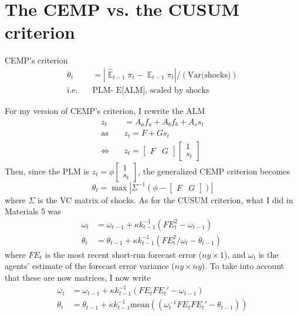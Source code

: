 \documentclass[11pt]{article}
\renewcommand{\[}{\begin{equation}}
\renewcommand{\]}{\end{equation}}
\DeclareMathOperator{\E}{\mathbb{E}}
\begin{document}
\clearpage


\newpage
\section{The CEMP vs. the CUSUM criterion}

CEMP's criterion  
\begin{align}
\theta_t & = |\hat{\E}_{t-1}\pi_t - \E_{t-1}\pi_t | / (\text{Var(shocks)}) \\
\text{i.e.} \quad &\text{PLM- E[ALM], scaled by shocks}
\end{align}

For my version of CEMP's criterion, I rewrite the ALM
\begin{align}
z_t & = A_a f_a + A_b f_b + A_s s_t \\
\text{as} \quad & z_t =  F  +Gs_t  \\
\Leftrightarrow \quad & z_t = \begin{bmatrix} F & G \end{bmatrix} \begin{bmatrix} 1 \\ s_t\end{bmatrix}
\end{align}
Then, since the PLM is $z_t = \phi  \begin{bmatrix} 1 \\ s_t\end{bmatrix}$, the generalized CEMP criterion becomes
\begin{equation}
\theta_t = \max | \Sigma^{-1} ( \phi - \begin{bmatrix} F & G \end{bmatrix}) |
\end{equation}
where $\Sigma$ is the VC matrix of shocks.
As for the CUSUM criterion, what I did in Materials 5 was
\begin{align}
 \omega_t & =  \omega_{t-1} + \kappa k_{t-1}^{-1}(FE_t^2 -\omega_{t-1})\\
\theta_t & =  \theta_{t-1} + \kappa k_{t-1}^{-1}(FE_t^2/\omega_t -\theta_{t-1})\
\end{align}
where $FE_t$ is the most recent short-run forecast error ($ny\times 1$), and $\omega_t$ is the agents' estimate of the forecast error variance ($ny \times ny$). To take into account that these are now matrices, I now write
\begin{align}
\omega_t & =  \omega_{t-1} + \kappa k_{t-1}^{-1}(FE_t FE_t' -\omega_{t-1})\\
\theta_t & =  \theta_{t-1} + \kappa k_{t-1}^{-1}\text{mean}((\omega_t^{-1}FE_t FE_t' -\theta_{t-1}))
\end{align}
\end{document}
